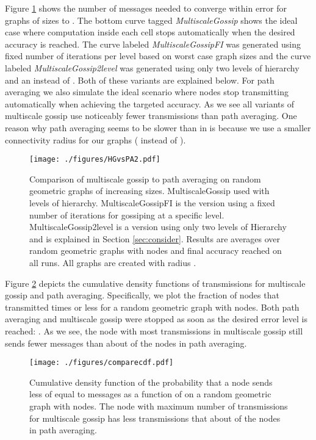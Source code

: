 Figure \ref{fig:hgvspa} shows the number of messages needed to converge within  error for graphs of sizes  to . The bottom curve tagged \textit{MultiscaleGossip} shows the ideal case where computation inside each cell stops automatically when the desired accuracy is reached. The curve labeled \textit{MultiscaleGossipFI} was generated using fixed number of iterations per level based on worst case graph sizes and the curve labeled \textit{MultiscaleGossip2level} was generated using only two levels of hierarchy and an  instead of . Both of these variants are explained below. For path averaging we also simulate the ideal scenario where nodes stop transmitting automatically when achieving the targeted accuracy. As we see all variants of  multiscale gossip use noticeably fewer transmissions than path averaging. One reason why path averaging seems to be slower than in \cite{benezit07} is because we use  a smaller connectivity radius for our graphs ( instead of ). 


\begin{figure} 
\begin{center}
\texttt{[image: ./figures/HGvsPA2.pdf]}
\caption{\label{fig:hgvspa} Comparison of multiscale gossip to path averaging on random geometric graphs of increasing sizes. MultiscaleGossip used with  levels of hierarchy. MultiscaleGossipFI is the version using a fixed number of iterations for gossiping at a specific level. MultiscaleGossip2level is a version using only two levels of Hierarchy and is explained in Section \ref{sec:consider}. Results are averages over  random geometric graphs with  nodes and final accuracy  reached on all runs. All graphs are created with radius .} 
\end{center}
\end{figure}


Figure \ref{fig:cdf} depicts the cumulative density functions of transmissions for multiscale gossip and path averaging. Specifically, we plot the fraction of nodes that transmitted  times or less for a random geometric graph with  nodes. Both path averaging and multiscale gossip were stopped as soon as the desired error level is reached: . As we see, the node with most transmissions in multiscale gossip still sends fewer messages than about  of the nodes in path averaging.  

\begin{figure}
\begin{center}
\texttt{[image: ./figures/comparecdf.pdf]}
\caption{\label{fig:cdf} Cumulative density function of the probability that a node sends less of equal to  messages as a function of  on a random geometric graph with  nodes. The node with maximum number of transmissions for multiscale gossip has less transmissions that about  of the nodes in path averaging.} 
\end{center}
\end{figure}


